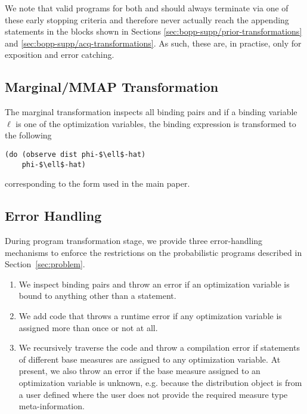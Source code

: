 We note that valid programs for both  and  should always terminate via one of these early stopping criteria and therefore never actually reach the appending statements in the  blocks shown in Sections \ref{sec:bopp-supp/prior-transformations} and \ref{sec:bopp-supp/acq-transformations}.  As such, these are, in practise, only for exposition and error catching.

\subsection{Marginal/MMAP Transformation}
The marginal transformation inspects all  binding pairs and if a binding variable $\ell$ is one of the optimization variables, the binding expression  is transformed to the following
    \begin{lstlisting}[basicstyle=\footnotesize\ttfamily]
(do (observe dist phi-$\ell$-hat)
    phi-$\ell$-hat)
    \end{lstlisting}
corresponding to the  form used in the main paper.

\subsection{Error Handling}
\label{sec:bopp:trans:error}
During program transformation stage, we provide three error-handling mechanisms to enforce the restrictions on the probabilistic programs described in Section~\ref{sec:problem}.
\begin{enumerate}
    \item We inspect  binding pairs and throw an error if an optimization variable is bound to anything other than a \sample statement.
    \item We add code that throws a runtime error if any optimization variable is assigned more than once or not at all.
    \item We recursively traverse the code and throw a compilation error if \sample statements of different base measures are assigned to any optimization variable.  At present, we also throw an error if the base measure assigned to an optimization variable is unknown, e.g. because the distribution object is from a user defined  where the user does not provide the required measure type meta-information.
\end{enumerate}
